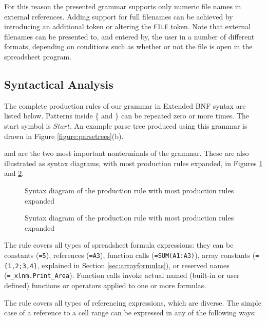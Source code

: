 \documentclass[times]{smrauth}
\begin{document}
For this reason the presented grammar supports only numeric file names in external references.
Adding support for full filenames can be achieved by introducing an additional token or altering the \texttt{FILE} token. Note that external filenames can be presented to, and entered by, the user in a number of different formats, depending on conditions such as whether or not the file is open in the spreadsheet program.

\subsection{Syntactical Analysis}
\label{subsection:productionRules}

The complete production rules of our grammar in Extended BNF syntax are listed below.
Patterns inside \{ and \} can be repeated zero or more times.
The start symbol is $Start$. An example parse tree produced using this grammar is drawn in Figure \ref{figure:parsetrees}(b).



 and  are the two most important nonterminals of the grammar.
These are also illustrated as syntax diagrams, with most production rules expanded, in Figures \ref{figure:Formula} and \ref{figure:Reference}.

\begin{figure}[]
	
	\caption{Syntax diagram of the  production rule with most production rules expanded}
	\label{figure:Formula}
\end{figure}

\begin{figure}[]
	\centering
	
	\caption{Syntax diagram of the  production rule with most production rules expanded}
	\label{figure:Reference}
\end{figure}

The  rule covers all types of spreadsheet formula expressions: they can be constants (\texttt{=5}), references (\texttt{=A3}), function calls (\texttt{=SUM(A1:A3)}), array constants (\texttt{=\{1,2;3,4\}}, explained in Section \ref{sec:arrayformulas}), or reserved names (\texttt{=_xlnm.Print_Area}). Function calls invoke actual named (built-in or user defined) functions or operators applied to one or more formulas.

The  rule covers all types of referencing expressions, which are diverse. The simple case of a reference to a cell range can be expressed in any of the following ways:
\end{document}
